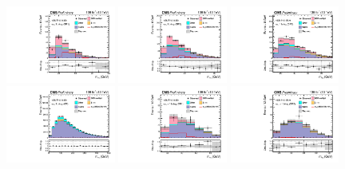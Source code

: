 \begin{figure}[ht]
    \begin{center}
        \includegraphics[width=0.32\textwidth]{figures/ch-10-results/em_all_1_post_prelim-yes.pdf}
        \includegraphics[width=0.32\textwidth]{figures/ch-10-results/em_all_2_post_prelim-yes.pdf}
        \includegraphics[width=0.32\textwidth]{figures/ch-10-results/em_all_3_post_prelim-yes.pdf}\\
        \includegraphics[width=0.32\textwidth]{figures/ch-10-results/em_all_4_post_prelim-yes.pdf}
        \includegraphics[width=0.32\textwidth]{figures/ch-10-results/em_all_5_post_prelim-yes.pdf}
        \includegraphics[width=0.32\textwidth]{figures/ch-10-results/em_all_6_post_prelim-yes.pdf}\\

\end{center}
\end{figure}
